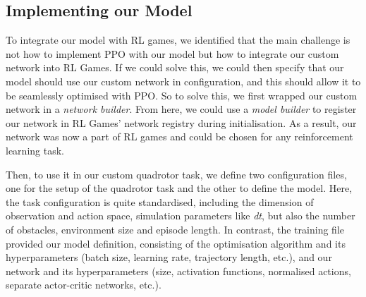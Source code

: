 \subsection{Implementing our Model}
\label{subsec:6_model_implementation}
To integrate our model with RL games, we identified that the main challenge is not how to implement PPO with our model but how to integrate our custom network into RL Games. If we could solve this, we could then specify that our model should use our custom network in configuration, and this should allow it to be seamlessly optimised with PPO.
So to solve this, we first wrapped our custom network in a \textit{network builder}. From here, we could use a \textit{model builder} to register our network in RL Games' network registry during initialisation. As a result, our network was now a part of RL games and could be chosen for any reinforcement learning task.

Then, to use it in our custom quadrotor task, we define two configuration files, one for the setup of the quadrotor task and the other to define the model. Here, the task configuration is quite standardised, including the dimension of observation and action space, simulation parameters like \textit{dt}, but also the number of obstacles, environment size and episode length. In contrast, the training file provided our model definition, consisting of the optimisation algorithm and its hyperparameters (batch size, learning rate, trajectory length, etc.), and our network and its hyperparameters (size, activation functions, normalised actions, separate actor-critic networks, etc.).

